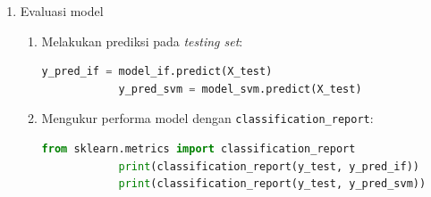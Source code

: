\begin{enumerate}
\begin{enumerate}
        \item Membaca data dari GCS:
        \begin{lstlisting}[language=Python]
            client = storage.Client()
            bucket = client.get_bucket('nama-bucket')
            blob = bucket.blob('cleaned_dataset.csv')
            data = pd.read_csv(blob.open('r'))
        \end{lstlisting}
        
        \item Membagi data menjadi {\it training set} dan {\it testing set}:
        \begin{lstlisting}[language=Python]
            from sklearn.model_selection import train_test_split
            X_train, X_test = train_test_split(data, test_size=0.2, random_state=42)
        \end{lstlisting}
        
        \item Melatih model {\it Isolation Forest} dan {\it One-Class SVM}:
        \begin{lstlisting}[language=Python]
            # Isolation Forest
            model_if = IsolationForest(n_estimators=100, contamination=0.1, random_state=42)
            model_if.fit(X_train)
            
            # One-Class SVM
            model_svm = OneClassSVM(kernel='rbf', gamma='auto')
            model_svm.fit(X_train)
        \end{lstlisting}
      \end{enumerate}
    
      \item {Evaluasi model}
      \begin{enumerate}
        \item Melakukan prediksi pada {\it testing set}:
        \begin{lstlisting}[language=Python]
            y_pred_if = model_if.predict(X_test)
            y_pred_svm = model_svm.predict(X_test)
        \end{lstlisting}
        
        \item Mengukur performa model dengan \texttt{classification\_report}:
        \begin{lstlisting}[language=Python]
            from sklearn.metrics import classification_report
            print(classification_report(y_test, y_pred_if))
            print(classification_report(y_test, y_pred_svm))
        \end{lstlisting}
      \end{enumerate}
    

\end{enumerate}
